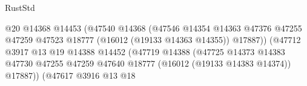 \begin{lexlean}{RustStd}
\begin{coremodule}
                                                            @20
                                                            @14368
                                                            @14453
                                                            (@47540
                                                              @14368
                                                              (@47546
                                                                @14354
                                                                @14363
                                                                @47376
                                                                @47255
                                                                @47259
                                                                @47523
                                                                @18777
                                                                (@16012 (@19133 @14363 @14355))
                                                                @17887))
                                                            (@47712
                                                              @3917
                                                              @13
                                                              @19
                                                              @14388
                                                              @14452
                                                              (@47719
                                                                @14388
                                                                (@47725
                                                                  @14373
                                                                  @14383
                                                                  @47730
                                                                  @47255
                                                                  @47259
                                                                  @47640
                                                                  @18777
                                                                  (@16012 (@19133 @14383 @14374))
                                                                  @17887))
                                                              (@47617
                                                                @3916
                                                                @13
                                                                @18

\end{coremodule}
\end{lexlean}

